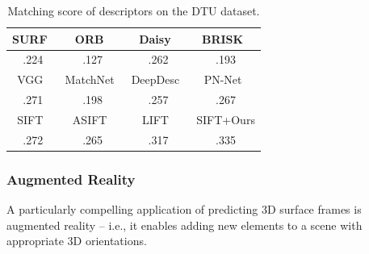 \begin{table}
    \centering
    \tabcolsep=0.12cm
    \begin{tabular}{|c|c|c|c|}
        \hline
         SURF~\cite{bay2006surf} & ORB~\cite{rublee2011orb} & Daisy~\cite{tola2010daisy} & BRISK~\cite{leutenegger2011brisk}\\
         \hline
         .224 & .127 & .262 & .193\\
        \hline
         VGG~\cite{kahler2015very} & MatchNet~\cite{han2015matchnet} & DeepDesc~\cite{simo2015discriminative} & PN-Net~\cite{balntas2016pn}\\
         \hline
         .271 & .198 & .257 & .267\\
        \hline
         SIFT~\cite{lowe2004distinctive} & ASIFT~\cite{yu2011asift} & LIFT~\cite{yi2016lift} & SIFT+Ours\\
         \hline
         .272 & .265 & .317 & .335\\
        \hline
    \end{tabular}
    \caption{Matching score of descriptors on the DTU dataset.}
    \label{tab:framenet-matching}
\vspace{-0.2in}
\end{table}
\subsubsection{Augmented Reality}
A particularly compelling application of predicting 3D surface frames is augmented reality -- i.e., it enables adding new elements to a scene with appropriate 3D orientations.

\vspace{-0.1in}
